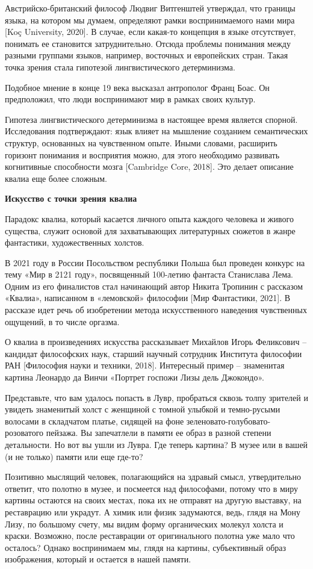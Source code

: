 Австрийско-британский философ Людвиг Витгенштей утверждал, что границы языка, на котором мы думаем, определяют рамки воспринимаемого нами мира [Koç University, 2020]. В случае, если какая-то концепция в языке отсутствует, понимать ее становится затруднительно. Отсюда проблемы понимания между разными группами языков, например, восточных и европейских стран. Такая точка зрения стала гипотезой лингвистического детерминизма.

Подобное мнение в конце 19 века высказал антрополог Франц Боас. Он предположил, что люди воспринимают мир в рамках своих культур.

Гипотеза лингвистического детерминизма в настоящее время является спорной. Исследования подтверждают: язык влияет на мышление созданием семантических структур, основанных на чувственном опыте. Иными словами, расширить горизонт понимания и восприятия можно, для этого необходимо развивать когнитивные способности мозга [Cambridge Core, 2018]. Это делает описание квалиа еще более сложным.

\textbf{Искусство с точки зрения квалиа}

Парадокс квалиа, который касается личного опыта каждого человека и живого существа, служит основой для захватывающих литературных сюжетов в жанре фантастики, художественных холстов.

В 2021 году в России Посольством республики Польша был проведен конкурс на тему «Мир в 2121 году», посвященный 100-летию фантаста Станислава Лема. Одним из его финалистов стал начинающий автор Никита Тропинин с рассказом «Квалиа», написанном в «лемовской» философии [Мир Фантастики, 2021]. В рассказе идет речь об изобретении метода искусственного наведения чувственных ощущений, в то числе оргазма.

О квалиа в произведениях искусства рассказывает Михайлов Игорь Феликсович – кандидат философских наук, старший научный сотрудник Института философии РАН [Философия науки и техники, 2018]. Интересный пример – знаменитая картина Леонардо да Винчи «Портрет госпожи Лизы дель Джокондо».

Представьте, что вам удалось попасть в Лувр, пробраться сквозь толпу зрителей и увидеть знаменитый холст с женщиной с томной улыбкой и темно-русыми волосами в складчатом платье, сидящей на фоне зеленовато-голубовато-розоватого пейзажа. Вы запечатлели в памяти ее образ в разной степени детальности. Но вот вы ушли из Лувра. Где теперь картина? В музее или в вашей (и не только) памяти или еще где-то?

Позитивно мыслящий человек, полагающийся на здравый смысл, утвердительно ответит, что полотно в музее, и посмеется над философами, потому что в миру картины остаются на своих местах, пока их не отправят на другую выставку, на реставрацию или украдут. А химик или физик задумаются, ведь, глядя на Мону Лизу, по большому счету, мы видим форму органических молекул холста и краски. Возможно, после реставрации от оригинального полотна уже мало что осталось? Однако воспринимаем мы, глядя на картины, субъективный образ изображения, который и остается в нашей памяти.

